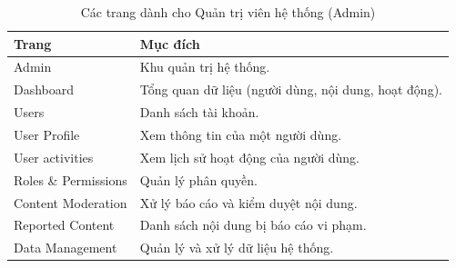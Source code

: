 \begin{table}[H]
\centering
\begin{tabular}{|p{5cm}|p{10cm}|}
\hline
Trang                 & Mục đích                                             \\ \hline
Admin                & Khu quản trị hệ thống.                               \\ \hline
Dashboard            & Tổng quan dữ liệu (người dùng, nội dung, hoạt động). \\ \hline
Users                & Danh sách tài khoản.                                 \\ \hline
User Profile         & Xem thông tin của một người dùng.                    \\ \hline
User activities      & Xem lịch sử hoạt động của người dùng.                \\ \hline
Roles \& Permissions & Quản lý phân quyền.                                  \\ \hline
Content Moderation   & Xử lý báo cáo và kiểm duyệt nội dung.                \\ \hline
Reported Content     & Danh sách nội dung bị báo cáo vi phạm.               \\ \hline
Data Management      & Quản lý và xử lý dữ liệu hệ thống.                   \\ \hline
\end{tabular}
\caption{Các trang dành cho Quản trị viên hệ thống (Admin)}
\label{tab:admin}
\end{table}

